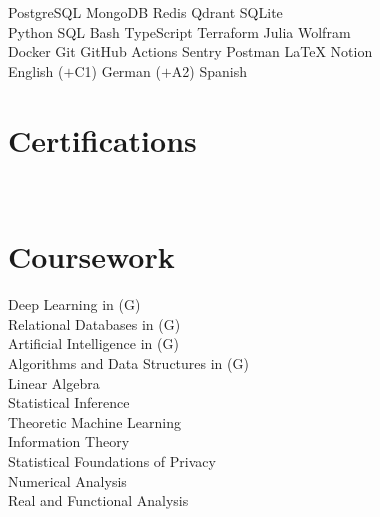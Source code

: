 \documentclass{tex/deedy-resume-openfont}
\begin{document}
\begin{minipage}[t]{0.32\textwidth}
PostgreSQL \textbullet{} 
MongoDB \textbullet{} 
Redis \textbullet{} 
Qdrant \textbullet{} 
SQLite \\[4pt]

Python \textbullet{} 
SQL \textbullet{} 
Bash \textbullet{} 
TypeScript \textbullet{} 
Terraform \textbullet{} 
Julia \textbullet{} 
Wolfram \\[4pt]

Docker \textbullet{} 
Git \textbullet{} 
GitHub Actions \textbullet{} 
Sentry \textbullet{} 
Postman \textbullet{} 
\LaTeX{} \textbullet{} 
Notion \\[4pt]

English ($+$C1) \textbullet{} German ($+$A2) \textbullet{} Spanish\\[4pt]


\section{Certifications}
\href{https://www.credly.com/badges/e618901b-4ee9-4470-aa58-df98790f17ea/public_url}{}\\[4pt]


\section{Coursework}
Deep Learning in (G)\\
Relational Databases in  (G)\\
Artificial Intelligence in  (G)\\
Algorithms and Data Structures in  (G)\\
Linear Algebra\\[4pt]

Statistical Inference\\
Theoretic Machine Learning\\
Information Theory\\
Statistical Foundations of Privacy\\
Numerical Analysis \\
Real and Functional Analysis


%
%

\end{minipage} 
\end{document}
